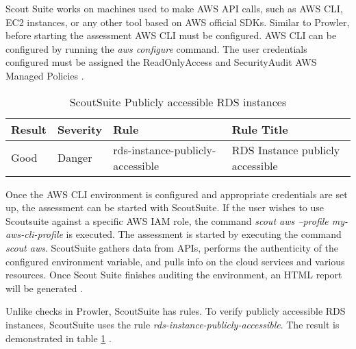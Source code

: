 \par Scout Suite works on machines used to make AWS API calls, such as AWS CLI, EC2 instances, or any other tool based on AWS official SDKs. Similar to Prowler, before starting the assessment AWS CLI must be configured.
AWS CLI can be configured by running the \textit{aws configure} command.
The user credentials configured must be assigned the ReadOnlyAccess and SecurityAudit AWS Managed Policies \cite{76}.

\begin{table}[h!]
    \begin{center}
        \caption{ScoutSuite Publicly accessible RDS instances}
        \label{tab:scoutsuiterule}
        \begin{tabular}{|p{1.4cm}|p{1.7cm}|p{5.0cm}|p{6.0cm}|}
            \hline
            \textbf{Result} & \textbf{Severity} & \textbf{Rule} & \textbf{Rule Title}\\
            \hline
            Good & Danger & rds-instance-publicly-accessible & RDS Instance publicly accessible \\
            \hline
        \end{tabular}
    \end{center}
\end{table}

Once the AWS CLI environment is configured and appropriate credentials are set up, the assessment can be started with ScoutSuite.
If the user wishes to use Scoutsuite against a specific AWS IAM role, the command \textit{scout aws --profile my-aws-cli-profile} is executed.
The assessment is started by executing the command \textit{scout aws}.
ScoutSuite gathers data from APIs, performs the authenticity of the configured environment variable, and pulls info on the cloud services and various resources.
Once Scout Suite finishes auditing the environment, an HTML report will be generated \cite{77}.

Unlike checks in Prowler, ScoutSuite has rules.
To verify publicly accessible RDS instances, ScoutSuite uses the rule \textit{rds-instance-publicly-accessible}.
The result is demonstrated in table \ref{tab:scoutsuiterule} \cite{77}.






